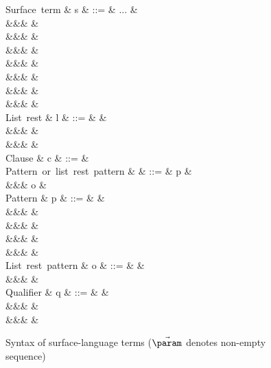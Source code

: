 \begin{figure}[H]
\begin{syntaxfig}
\mbox{Surface term}
&
s
&
::=
&
...
&
\\
&&&
&
\\
&&&
&
\\
&&&
&
\\
&&&
&
\\
&&&
&
\\
&&&
&
\\
&&&
&
\\[2mm]

\mbox{List rest}
&
l
&
::=
&
\hole
&
\\
&&&
\annListEnd{\alpha}
&
\\
&&&
&
\\[2mm]

\mbox{Clause}
&
c
&
::=
&
\\[2mm]

\mbox{Pattern or list rest pattern}
&
\pi
&
::=
&
p
&
\\
&&&
o
&
\\[2mm]

\mbox{Pattern}
&
p
&
::=
&
&
\\
&&&
\pattNil
&
\\
&&&
&
\\
&&&
&
\\
&&&
&
\\[2mm]

\mbox{List rest pattern}
&
o
&
::=
&
\pattSNil
&
\\
&&&
&
\\[2mm]

\mbox{Qualifier}
&
q
&
::=
&
&
\\
&&&
&
\\
&&&
&
\\[2mm]

\end{syntaxfig}
\caption{Syntax of surface-language terms ($\vec{\param}$ denotes non-empty sequence)}
\end{figure}
